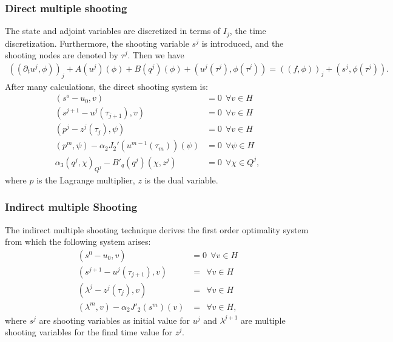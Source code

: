 \documentclass[11pt, a4paper]{article}
\theoremstyle{definition}
\begin{document}
\subsubsection{Direct multiple shooting}
The state and adjoint variables are discretized in terms of $I_j$, the time discretization. Furthermore, the shooting variable $s^j$ is introduced, and the shooting nodes are denoted by $\tau^j$.
Then we have
\begin{align*}
((\partial_t u^j, \phi))_j + A(u^j) (\phi ) + B(q^j)(\phi) + (u^j(\tau^j),\phi(\tau^j)) = ((f,\phi))_j+(s^j, \phi(\tau^j)).
\end{align*}
After many calculations, the direct shooting system is:
\begin{align*}
(s^o-u_0,v)&=0\ \  \forall v \in H\\
(s^{j+1}-u^j(\tau_{j+1}), v) &= 0 \ \ \forall v \in H\\
(p^j - z^j(\tau_j), \psi) &= 0\ \  \forall v \in H\\
(p^m, \psi) - \alpha_2 J_2' (u^{m-1}(\tau_m))(\psi) &=0\ \  \forall \psi \in H\\
\alpha_3(q^j, \chi)_{Q^j}- B'_q(q^j)(\chi,z^j) &= 0\ \  \forall \chi \in Q^j,
\end{align*}
where $p$ is the Lagrange multiplier, $z$ is the dual variable.
\subsubsection{Indirect multiple Shooting}
The indirect multiple shooting technique derives the first order optimality system from which the following system arises:
\begin{align*}
(s^0 -u_0,v)&=0 \ \ \forall v \in H\\
(s^{j+1}- u^j(\tau_{j+1}),v) & = \ \ \forall v \in H\\
(\lambda^j - z^j(\tau_j),v) & = \ \ \forall v \in H \\
(\lambda^m,v) - \alpha_2 J'_2(s^m)(v) & = \ \ \forall v \in H,
\end{align*}
where $s^j$ are shooting variables as initial value for $u^j$ and $\lambda^{j+1}$ are multiple shooting variables for the final time value for $z^j$.
\end{document}
